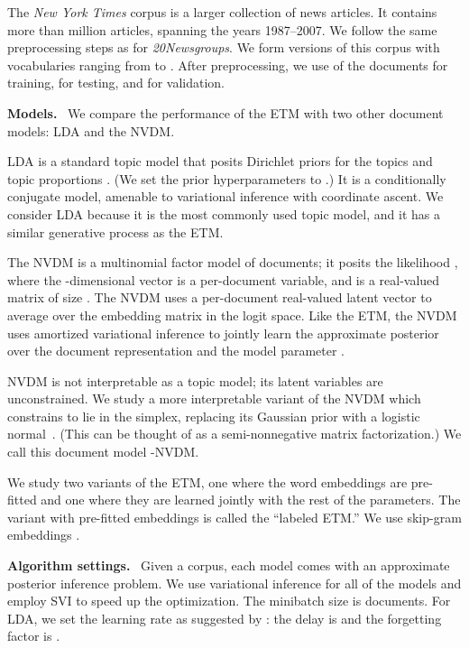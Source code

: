 \documentclass[11pt,a4paper]{article}
\DeclareRobustCommand{\parhead}[1]{\noindent\textbf{#1}~}
\begin{document}
The \emph{New York Times} corpus is a larger collection of news
articles.  It contains more than  million articles, spanning the
years 1987--2007.  We follow the same preprocessing steps as for
\emph{20Newsgroups}.  We form versions of this corpus with
vocabularies ranging from  to .  After
preprocessing, we use  of the documents for training,  for
testing, and  for validation.


\parhead{Models.} We compare the performance of the \gls{ETM} with two
other document models: \gls{LDA} and the \gls{NVDM}.

\gls{LDA} \citep{blei2003latent} is a standard topic model that posits
Dirichlet priors for the topics  and topic proportions
. (We set the prior hyperparameters to .) It is a
conditionally conjugate model, amenable to variational inference with
coordinate ascent.  We consider \gls{LDA} because it is the most
commonly used topic model, and it has a similar generative process as
the \gls{ETM}.



The \gls{NVDM} \citep{miao2016neural} is a multinomial factor model of
documents; it posits the likelihood
, where the
-dimensional vector  is a
per-document variable, and  is a real-valued matrix of size
.  The \gls{NVDM} uses a per-document real-valued latent vector
 to average over the embedding matrix  in the logit
space.  Like the \gls{ETM}, the \gls{NVDM} uses amortized variational
inference to jointly learn the approximate posterior over the document
representation  and the model parameter .

\gls{NVDM} is not interpretable as a topic model; its latent variables
are unconstrained.  We study a more interpretable variant of the
\gls{NVDM} which constrains  to lie in the simplex,
replacing its Gaussian prior with a logistic
normal~\citep{Aitchison:1980}.  (This can be thought of as a
semi-nonnegative matrix factorization.)  We call this document model
-\gls{NVDM}.

We study two variants of the \gls{ETM}, one where the word embeddings
are pre-fitted and one where they are learned jointly with the rest of
the parameters.  The variant with pre-fitted embeddings is called the
``labeled \gls{ETM}.'' We use skip-gram embeddings
\citep{mikolov2013distributed}.

\parhead{Algorithm settings.}  Given a corpus, each model comes with an
approximate posterior inference problem.  We use variational inference
for all of the models and employ \gls{SVI} \citep{Hoffman2013} to
speed up the optimization. The minibatch size is  documents.
For \gls{LDA}, we set the learning rate as suggested by \citet{Hoffman2013}: the
delay is  and the forgetting factor is .
\end{document}
